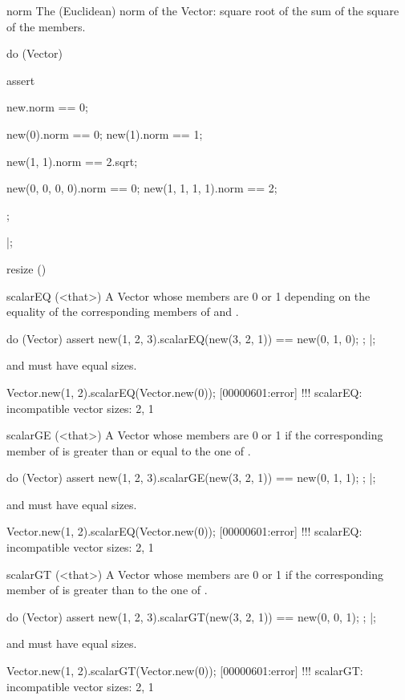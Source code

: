\begin{urbiscriptapi}
\item[norm]%
  The (Euclidean) norm of the Vector: square root of the sum of the square
  of the members.
\begin{urbiscript}
do (Vector)
{
  assert
  {
    new.norm == 0;

    new(0).norm == 0;
    new(1).norm == 1;

    new(1, 1).norm == 2.sqrt;

    new(0, 0, 0, 0).norm == 0;
    new(1, 1, 1, 1).norm == 2;
  };
}|;
\end{urbiscript}


\item[resize]()%

\item[scalarEQ](<that>)%
  A Vector whose members are 0 or 1 depending on the equality of the
  corresponding members of \this and \that.
\begin{urbiscript}
do (Vector)
{
  assert
  {
    new(1, 2, 3).scalarEQ(new(3, 2, 1)) == new(0, 1, 0);
  };
}|;
\end{urbiscript}
  \this and \that must have equal sizes.
\begin{urbiscript}
Vector.new(1, 2).scalarEQ(Vector.new(0));
[00000601:error] !!! scalarEQ: incompatible vector sizes: 2, 1
\end{urbiscript}

\item[scalarGE](<that>)%
  A Vector whose members are 0 or 1 if the corresponding member of \this is
  greater than or equal to the one of \that.
\begin{urbiscript}
do (Vector)
{
  assert
  {
    new(1, 2, 3).scalarGE(new(3, 2, 1)) == new(0, 1, 1);
  };
}|;
\end{urbiscript}
  \this and \that must have equal sizes.
\begin{urbiscript}
Vector.new(1, 2).scalarEQ(Vector.new(0));
[00000601:error] !!! scalarEQ: incompatible vector sizes: 2, 1
\end{urbiscript}

\item[scalarGT](<that>)%
  A Vector whose members are 0 or 1 if the corresponding member of \this is
  greater than to the one of \that.
\begin{urbiscript}
do (Vector)
{
  assert
  {
    new(1, 2, 3).scalarGT(new(3, 2, 1)) == new(0, 0, 1);
  };
}|;
\end{urbiscript}
  \this and \that must have equal sizes.
\begin{urbiscript}
Vector.new(1, 2).scalarGT(Vector.new(0));
[00000601:error] !!! scalarGT: incompatible vector sizes: 2, 1
\end{urbiscript}


\end{urbiscriptapi}
